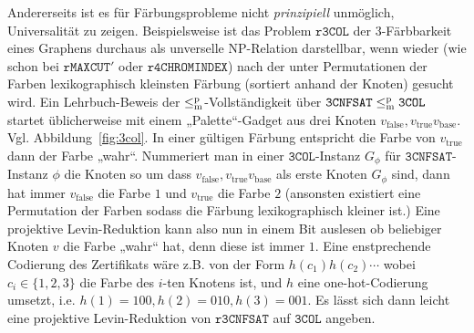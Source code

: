 Andererseits ist es für Färbungsprobleme nicht \emph{prinzipiell} unmöglich, Universalität zu zeigen. Beispielsweise ist das Problem $\mathtt{r3COL}$ der 3-Färbbarkeit eines Graphens durchaus als unverselle NP-Relation darstellbar, wenn wieder (wie schon bei $\mathtt{rMAXCUT}'$ oder $\mathtt{r4CHROMINDEX}$) nach der unter Permutationen der Farben lexikographisch kleinsten Färbung (sortiert anhand der Knoten) gesucht wird.
Ein Lehrbuch-Beweis der $\leq_\mathrm{m}^\mathrm{p}$-Vollständigkeit über $\mathtt{3CNFSAT}\leq_\mathrm{m}^\mathrm{p}\mathtt{3COL}$ startet üblicherweise mit einem „Palette“-Gadget aus drei Knoten $v_{\text{false}}, v_{\text{true}} v_{\text{base}}$. Vgl. Abbildung~\ref{fig:3col}. In einer gültigen Färbung entspricht die Farbe von $v_{\text{true}}$ dann der Farbe „wahr“. Nummeriert man in einer $\mathtt{3COL}$-Instanz $G_\phi$ für $\mathtt{3CNFSAT}$-Instanz $\phi$ die Knoten  so  um dass $v_{\text{false}}, v_{\text{true}} v_{\text{base}}$ als erste Knoten $G_\phi$ sind, dann hat immer $v_{\text{false}}$ die Farbe $1$ und $v_{\text{true}}$ die Farbe $2$ (ansonsten existiert eine Permutation der Farben sodass die Färbung lexikographisch kleiner ist.)
Eine projektive Levin-Reduktion kann also nun in einem Bit auslesen ob beliebiger Knoten $v$ die Farbe „wahr“ hat, denn diese ist immer $1$.
Eine enstprechende Codierung des Zertifikats wäre z.B. von der Form $h(c_1)h(c_2)\cdots$ wobei $c_i\in\{1,2,3\}$ die Farbe des $i$-ten Knotens ist, und $h$ eine one-hot-Codierung umsetzt, i.e. $h(1)=100, h(2)=010, h(3)=001$. Es lässt sich dann leicht eine projektive Levin-Reduktion von $\mathtt{r3CNFSAT}$ auf $\mathtt{3COL}$ angeben.

